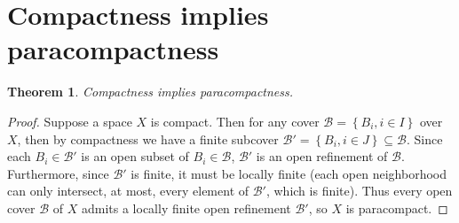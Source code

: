 \documentclass{article}
\newtheorem{theorem}[subsection]{Theorem}
\theoremstyle{definition}
\newcommand{\set}[1]{\left\{#1\right\}}
\begin{document}
\section{Compactness implies paracompactness}
\begin{theorem}
Compactness implies paracompactness.
\end{theorem}
\begin{proof}
Suppose a space $X$ is compact. Then for any cover $\mathcal{B}
=\set{B_i, i\in I}$ over $X$,
then by compactness we have a finite subcover 
$\mathcal{B}'=\set{B_i, i\in J} \subseteq \mathcal{B}$. Since each 
$B_i \in \mathcal{B}'$ is an open subset of $B_i \in \mathcal{B}$, 
$\mathcal{B}'$ is an open refinement of $\mathcal{B}$. Furthermore, since
$\mathcal{B}'$ is finite, it must be locally finite (each open neighborhood
can only intersect, at most, every element of $\mathcal{B}'$, which is finite). 
Thus
every open cover $\mathcal{B}$ of $X$ admits a locally finite open refinement
$\mathcal{B}'$, so $X$
is paracompact.
\end{proof}
\end{document}
